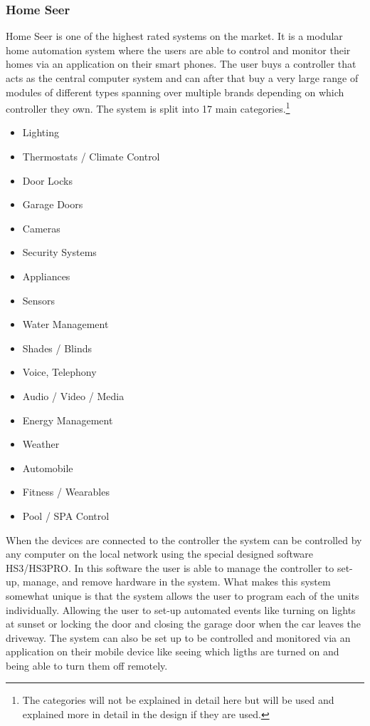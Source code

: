 \subsubsection{Home Seer}
Home Seer is one of the highest rated systems on the market. It is a modular home automation system where the users are able to control and monitor their homes via an application on their smart phones. The user buys a controller that acts as the central computer system and can after that buy a very large range of modules of different types spanning over multiple brands depending on which controller they own. The system is split into 17 main categories.\footnote{The categories will not be explained in detail here but will be used and explained more in detail in the design if they are used.}
\begin{itemize}
	\item Lighting
	\item Thermostats / Climate Control
	\item Door Locks
	\item Garage Doors
	\item Cameras
	\item Security Systems
	\item Appliances
	\item Sensors
	\item Water Management
	\item Shades / Blinds
	\item Voice, Telephony
	\item Audio / Video / Media
	\item Energy Management
	\item Weather
	\item Automobile
	\item Fitness / Wearables
	\item Pool / SPA Control
\end{itemize}%
When the devices are connected to the controller the system can be controlled by any computer on the local network using the special designed software HS3/HS3PRO. In this software the user is able to manage the controller to set-up, manage, and remove hardware in the system. What makes this system somewhat unique is that the system allows the user to program each of the units individually. Allowing the user to set-up automated events like turning on lights at sunset or locking the door and closing the garage door when the car leaves the driveway. The system can also be set up to be controlled and monitored via an application on their mobile device like seeing which ligths are turned on and being able to turn them off remotely.%

